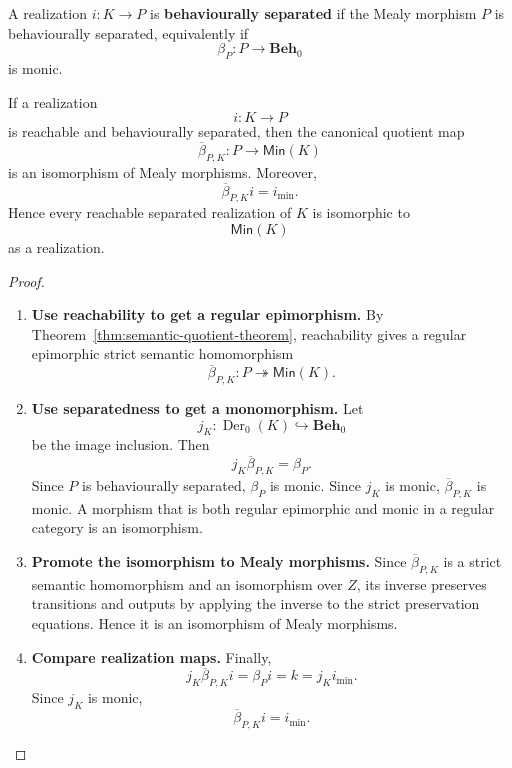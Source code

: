 \begin{definition}
\label{def:separated-realization}
    A realization \(i:K\to P\) is \textbf{behaviourally separated} if the Mealy morphism \(P\) is behaviourally separated, equivalently if
    \[
        \beta_P:P\to\mathbf{Beh}_0
    \]
    is monic.
\end{definition}

\begin{theorem}
\label{thm:minimal-realization}
    If a realization
    \[
        i:K\to P
    \]
    is reachable and behaviourally separated, then the canonical quotient map
    \[
        \overline{\beta}_{P,K}:P\to\mathsf{Min}(K)
    \]
    is an isomorphism of Mealy morphisms. Moreover,
    \[
        \overline{\beta}_{P,K}i=i_{\min}.
    \]
    Hence every reachable separated realization of \(K\) is isomorphic to
    \[
        \mathsf{Min}(K)
    \]
    as a realization.
\end{theorem}
\begin{proof}
    \leavevmode
    \begin{enumerate}
        \item \textbf{Use reachability to get a regular epimorphism.} By Theorem~\ref{thm:semantic-quotient-theorem}, reachability gives a regular epimorphic strict semantic homomorphism
        \[
            \overline{\beta}_{P,K}:P\twoheadrightarrow\mathsf{Min}(K).
        \]

        \item \textbf{Use separatedness to get a monomorphism.} Let
        \[
            j_K:\operatorname{Der}_0(K)\hookrightarrow\mathbf{Beh}_0
        \]
        be the image inclusion. Then
        \[
            j_K\overline{\beta}_{P,K}=\beta_P.
        \]
        Since \(P\) is behaviourally separated, \(\beta_P\) is monic. Since \(j_K\) is monic, \(\overline{\beta}_{P,K}\) is monic. A morphism that is both regular epimorphic and monic in a regular category is an isomorphism.

        \item \textbf{Promote the isomorphism to Mealy morphisms.} Since \(\overline{\beta}_{P,K}\) is a strict semantic homomorphism and an isomorphism over \(Z\), its inverse preserves transitions and outputs by applying the inverse to the strict preservation equations. Hence it is an isomorphism of Mealy morphisms.

        \item \textbf{Compare realization maps.} Finally,
        \[
            j_K\overline{\beta}_{P,K}i
            =
            \beta_P i
            =
            k
            =
            j_K i_{\min}.
        \]
        Since \(j_K\) is monic,
        \[
            \overline{\beta}_{P,K}i=i_{\min}.
        \]
    \end{enumerate}
\end{proof}

